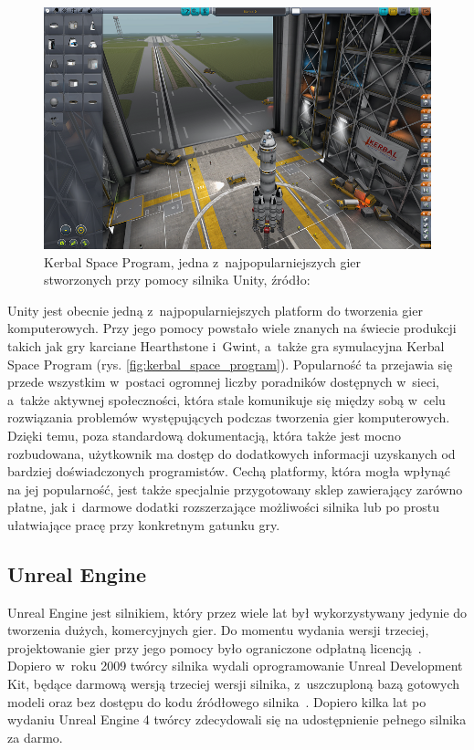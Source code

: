 \begin{figure}[h]
	\centering
	\includegraphics[width=0.7\linewidth]{images/kerbal_space_program.png}
	\caption{Kerbal Space Program, jedna z~najpopularniejszych gier stworzonych przy pomocy silnika Unity, źródło:~\cite{kerbal_your_enthusiasm}}
	\label{fig:kerbal_spaów wysokopoziomowych.ce_program}
\end{figure}

Unity jest obecnie jedną z~najpopularniejszych platform do tworzenia gier komputerowych. Przy jego pomocy powstało wiele znanych na świecie produkcji takich jak gry karciane Hearthstone i~Gwint, a~także gra symulacyjna Kerbal Space Program (rys. \ref{fig:kerbal_space_program}). Popularność ta przejawia się przede wszystkim w~postaci ogromnej liczby poradników dostępnych w~sieci, a~także aktywnej społeczności, która stale komunikuje się między sobą w~celu rozwiązania problemów występujących podczas tworzenia gier komputerowych. Dzięki temu, poza standardową dokumentacją, która także jest mocno rozbudowana, użytkownik ma dostęp do dodatkowych informacji uzyskanych od bardziej doświadczonych programistów. Cechą platformy, która mogła wpłynąć na jej popularność, jest także specjalnie przygotowany sklep zawierający zarówno płatne, jak i~darmowe dodatki rozszerzające możliwości silnika lub po prostu ułatwiające pracę przy konkretnym gatunku gry.

\subsection{Unreal Engine}
Unreal Engine jest silnikiem, który przez wiele lat był wykorzystywany jedynie do tworzenia dużych, komercyjnych gier. Do momentu wydania wersji trzeciej, projektowanie gier przy jego pomocy było ograniczone odpłatną licencją~\cite{unreal_manual}. Dopiero w~roku 2009 twórcy silnika wydali oprogramowanie Unreal Development Kit, będące darmową wersją trzeciej wersji silnika, z~uszczuploną bazą gotowych modeli oraz bez dostępu do kodu źródłowego silnika~\cite{udk_manual}. Dopiero kilka lat po wydaniu Unreal Engine 4 twórcy zdecydowali się na udostępnienie pełnego silnika za darmo. 

